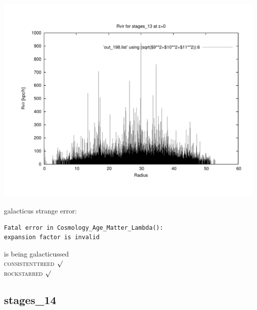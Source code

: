\includegraphics[scale=0.3]{stages_13/plot_rvir_z0.pdf}

galacticus strange error: 
\begin{verbatim}
Fatal error in Cosmology_Age_Matter_Lambda():
expansion factor is invalid
\end{verbatim}
is being galacticussed \\
\textsc{consistenttreed} $\surd$ \\ 
\textsc{rockstarred} $\surd$

% 
%
%
%
%
%
%
%


\newpage
\subsection{stages\_14}

